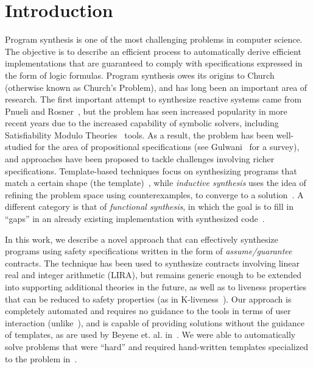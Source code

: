 
\section{Introduction}

Program synthesis is one of the most challenging problems in computer science. The objective is to describe an efficient process to automatically derive efficient implementations that are guaranteed to comply with specifications expressed in the form of logic formulas. Program synthesis owes its origins to Church~\cite{church1962logic} (otherwise known as Church's Problem), and has long been an important area of research.
%
%
The first important attempt to synthesize reactive systems came from Pnueli and Rosner~\cite{pnueli1989synthesis}, but the problem has seen increased popularity in more recent years due to the increased capability of symbolic solvers, including Satisfiability Modulo Theories~\cite{BarFT-SMTLIB} tools. As a result, the problem has been well-studied for the area of propositional specifications (see Gulwani~\cite{gulwani2010dimensions} for a survey), and approaches have been proposed to tackle challenges involving richer specifications. Template-based techniques focus on synthesizing programs that
match a certain shape (the template)~\cite{srivastava2013template}, while {\em inductive synthesis} uses the idea of refining the problem space using counterexamples, to converge to a solution~\cite{flener2001inductive}. A different category is that of \textit{functional synthesis}, in which the goal is to fill in ``gaps'' in an already existing implementation with synthesized code~\cite{kuncak2013functional}.

In this work, we describe a novel approach that can effectively synthesize
programs using safety specifications written in the form of {\em
assume/guarantee} contracts. The technique has been used to synthesize contracts involving linear real and integer arithmetic (LIRA),
but remains generic enough to be extended into supporting additional theories
in the future, as well as to liveness properties that can be reduced to safety properties (as in K-liveness~\cite{claessen2012liveness}).  Our approach is completely automated and requires no guidance to the tools in terms of user interaction (unlike~\cite{ryzhyk2014user,ryzhyk2016developing}), and is capable of providing solutions without the guidance of templates, as are used by Beyene et. al.
in~\cite{beyene2014constraint}.  We were able to automatically solve problems that were ``hard'' and required hand-written templates specialized to the problem in~\cite{beyene2014constraint}.

